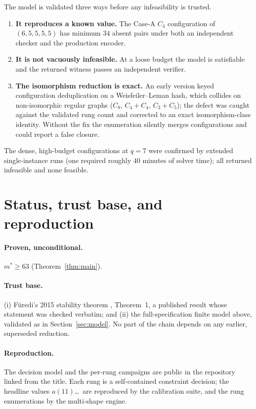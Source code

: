 \documentclass[11pt]{article}
\theoremstyle{definition}
\newcommand{\mstar}{m^{*}}
\begin{document}
The model is validated three ways before any infeasibility is trusted.
\begin{enumerate}
  \item \textbf{It reproduces a known value.} The Case-A $C_4$ configuration of
    $(6,5,5,5,5)$ has minimum $34$ absent pairs under both an independent checker
    and the production encoder.
  \item \textbf{It is not vacuously infeasible.} At a loose budget the model is
    satisfiable and the returned witness passes an independent verifier.
  \item \textbf{The isomorphism reduction is exact.} An early version keyed
    configuration deduplication on a Weisfeiler--Leman hash, which collides on
    non-isomorphic regular graphs ($C_8$, $C_4 + C_4$, $C_3 + C_5$); the defect was
    caught against the validated rung count and corrected to an exact
    isomorphism-class identity. Without the fix the enumeration silently merges
    configurations and could report a false closure.
\end{enumerate}
The dense, high-budget configurations at $q = 7$ were confirmed by extended
single-instance runs (one required roughly $40$ minutes of solver time); all
returned infeasible and none feasible.

\section{Status, trust base, and reproduction}

\paragraph{Proven, unconditional.} $\mstar \ge 63$ (Theorem~\ref{thm:main}).

\paragraph{Trust base.} (i) F\"uredi's 2015 stability theorem \cite{Fu15},
Theorem~1, a published result whose statement was checked verbatim; and (ii) the
full-specification finite model above, validated as in Section~\ref{sec:model}. No
part of the chain depends on any earlier, superseded reduction.

\paragraph{Reproduction.} The decision model and the per-rung campaigns are public
in the repository linked from the title. Each rung is a self-contained constraint
decision; the headline values $a(11)$\ldots\ are reproduced by the calibration
suite, and the rung enumerations by the multi-shape engine.
\end{document}
